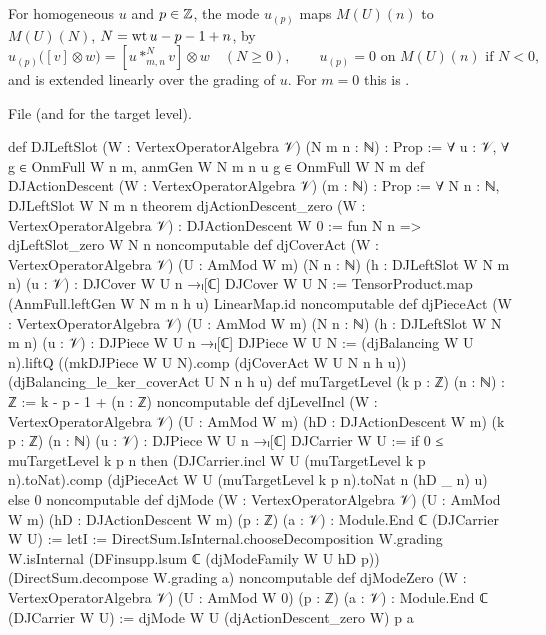\begin{definition}\label{l13:def:djmode}
For homogeneous $u$ and $p\in{\mathbb{Z}}$, the mode $u_{(p)}$ maps $M(U)(n)$ to $M(U)(N)$, $N = \operatorname{wt} u - p - 1 + n$, by
\begin{equation*}
 u_{(p)}\bigl([v]\otimes w\bigr) = [u*^N_{m,n}v]\otimes w\quad(N\ge0),\qquad u_{(p)} = 0\text{ on }M(U)(n)\text{ if }N<0,
\end{equation*}
and is extended linearly over the grading of $u$. For $m = 0$ this is .
\end{definition}
\noindent File  (and
 for the target level).
\begin{leancode}
def DJLeftSlot (W : VertexOperatorAlgebra 𝒱) (N m n : ℕ) : Prop :=
  ∀ u : 𝒱, ∀ g ∈ OnmFull W n m, anmGen W N m n u g ∈ OnmFull W N m
def DJActionDescent (W : VertexOperatorAlgebra 𝒱) (m : ℕ) : Prop :=
  ∀ N n : ℕ, DJLeftSlot W N m n
theorem djActionDescent_zero (W : VertexOperatorAlgebra 𝒱) : DJActionDescent W 0 :=
  fun N n => djLeftSlot_zero W N n
noncomputable def djCoverAct (W : VertexOperatorAlgebra 𝒱) (U : AmMod W m) (N n : ℕ)
    (h : DJLeftSlot W N m n) (u : 𝒱) : DJCover W U n →ₗ[ℂ] DJCover W U N :=
  TensorProduct.map (AnmFull.leftGen W N m n h u) LinearMap.id
noncomputable def djPieceAct (W : VertexOperatorAlgebra 𝒱) (U : AmMod W m) (N n : ℕ)
    (h : DJLeftSlot W N m n) (u : 𝒱) : DJPiece W U n →ₗ[ℂ] DJPiece W U N :=
  (djBalancing W U n).liftQ ((mkDJPiece W U N).comp (djCoverAct W U N n h u))
    (djBalancing_le_ker_coverAct U N n h u)
def muTargetLevel (k p : ℤ) (n : ℕ) : ℤ := k - p - 1 + (n : ℤ)
noncomputable def djLevelIncl (W : VertexOperatorAlgebra 𝒱) (U : AmMod W m)
    (hD : DJActionDescent W m) (k p : ℤ) (n : ℕ) (u : 𝒱) :
    DJPiece W U n →ₗ[ℂ] DJCarrier W U :=
  if 0 ≤ muTargetLevel k p n then
    (DJCarrier.incl W U (muTargetLevel k p n).toNat).comp
      (djPieceAct W U (muTargetLevel k p n).toNat n (hD _ n) u)
  else 0
noncomputable def djMode (W : VertexOperatorAlgebra 𝒱) (U : AmMod W m)
    (hD : DJActionDescent W m) (p : ℤ) (a : 𝒱) : Module.End ℂ (DJCarrier W U) :=
  letI := DirectSum.IsInternal.chooseDecomposition W.grading W.isInternal
  (DFinsupp.lsum ℂ (djModeFamily W U hD p)) (DirectSum.decompose W.grading a)
noncomputable def djModeZero (W : VertexOperatorAlgebra 𝒱) (U : AmMod W 0) (p : ℤ) (a : 𝒱) :
    Module.End ℂ (DJCarrier W U) :=
  djMode W U (djActionDescent_zero W) p a
\end{leancode}

